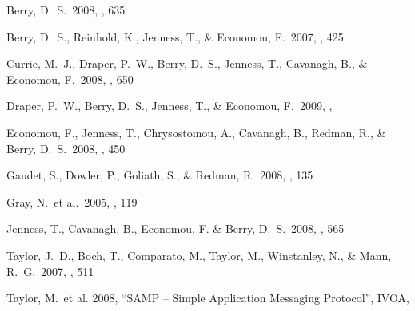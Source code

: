 \documentclass[11pt,twoside]{article}  %
\begin{document}
\begin{references}

 Berry, D.~S.\ 2008, \adassxvii, 635

 Berry, D.~S., Reinhold, K., Jenness, T., \& Economou, F.\ 2007,
 \adassxvi, 425

 Currie, M.~J., Draper, P.~W., Berry, D.~S., Jenness, T., Cavanagh, B., \& Economou, F.\ 2008, \adassxvii, 650

 Draper, P.~W., Berry, D.~S., Jenness, T., \& Economou, F.\ 2009,
  \adassxviii, 

 Economou, F., Jenness, T., Chrysostomou, A., Cavanagh, B., Redman, R., \& Berry, D.~S.\ 2008, \adassxvii, 450

 Gaudet, S., Dowler, P., Goliath, S., \& Redman, R.\ 2008, \adassxvii, 135

 Gray, N.\ et al.\ 2005, \adassxiv, 119

 Jenness, T., Cavanagh, B., Economou, F. \& Berry, D.~S.\ 2008, \adassxvii, 565

 Taylor, J.~D., Boch, T., Comparato, M., Taylor, M., Winstanley, N., \& Mann, R.~G.\ 2007, \adassxvi, 511

 Taylor, M.\ et al. 2008, ``SAMP -- Simple Application Messaging Protocol'', IVOA, 
    
\end{references}

\end{document}
